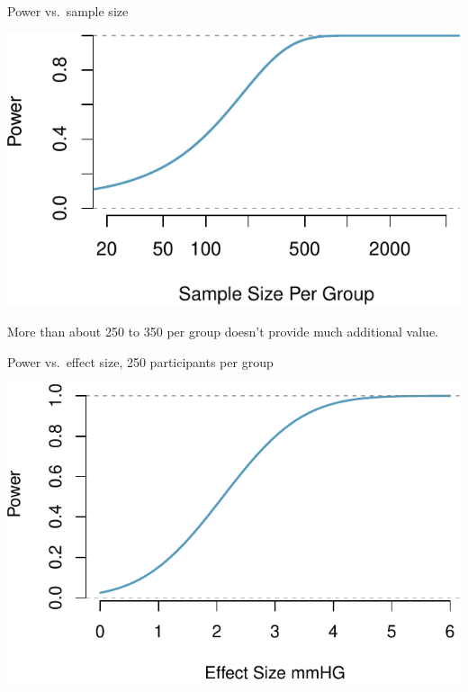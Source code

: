 \documentclass[ignorenonframetext,]{beamer}
\begin{document}
\begin{frame}{%
\protect\hypertarget{power-vs.sample-size}{%
Power vs.~sample size}}

\small

\includegraphics{med_student_2019_files/figure-beamer/power_sample-1.pdf}

More than about 250 to 350 per group doesn’t provide much additional
value.

\end{frame}

\begin{frame}{%
\protect\hypertarget{power-vs.effect-size-250-participants-per-group}{%
Power vs.~effect size, 250 participants per group}}

\small

\includegraphics{med_student_2019_files/figure-beamer/power_effect-1.pdf}

\end{frame}
\end{document}
